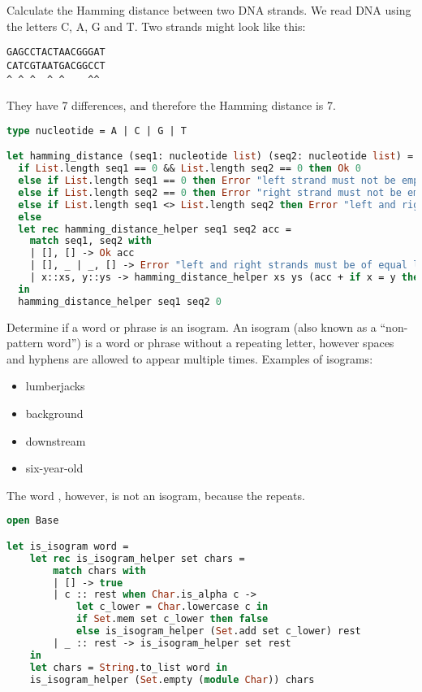 Calculate the Hamming distance between two DNA strands.
We read DNA using the letters C, A, G and T.
Two strands might look like this:
\begin{verbatim}
GAGCCTACTAACGGGAT
CATCGTAATGACGGCCT
^ ^ ^  ^ ^    ^^
\end{verbatim}
They have 7 differences, and therefore the Hamming distance is 7.

\begin{lstlisting}[language=OCaml]
type nucleotide = A | C | G | T

let hamming_distance (seq1: nucleotide list) (seq2: nucleotide list) =
  if List.length seq1 == 0 && List.length seq2 == 0 then Ok 0
  else if List.length seq1 == 0 then Error "left strand must not be empty"
  else if List.length seq2 == 0 then Error "right strand must not be empty"
  else if List.length seq1 <> List.length seq2 then Error "left and right strands must be of equal length"
  else
  let rec hamming_distance_helper seq1 seq2 acc = 
    match seq1, seq2 with
    | [], [] -> Ok acc
    | [], _ | _, [] -> Error "left and right strands must be of equal length"
    | x::xs, y::ys -> hamming_distance_helper xs ys (acc + if x = y then 0 else 1)
  in
  hamming_distance_helper seq1 seq2 0
\end{lstlisting}

Determine if a word or phrase is an isogram.
An isogram (also known as a ``non-pattern word'') is a word or phrase without a repeating letter, however spaces and hyphens are allowed to appear multiple times.
Examples of isograms:

\begin{itemize}
  \item lumberjacks
  \item background
  \item downstream
  \item six-year-old
\end{itemize}
The word , however, is not an isogram, because the  repeats.

\begin{lstlisting}[language=OCaml]
open Base

let is_isogram word =
    let rec is_isogram_helper set chars =
        match chars with
        | [] -> true
        | c :: rest when Char.is_alpha c ->
            let c_lower = Char.lowercase c in
            if Set.mem set c_lower then false
            else is_isogram_helper (Set.add set c_lower) rest
        | _ :: rest -> is_isogram_helper set rest
    in
    let chars = String.to_list word in
    is_isogram_helper (Set.empty (module Char)) chars
\end{lstlisting}

